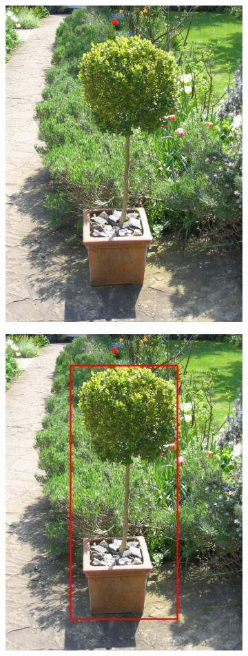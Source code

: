 \documentclass[a4paper,11]{article}
\begin{document}
\begin{center}
\begin{figure}[H]
    \begin{subfigure}{0.33\textwidth}
      \centering
      \includegraphics[width=0.9\linewidth]{images/bush}
    \end{subfigure}
    \begin{subfigure}{.33\textwidth}
      \centering
      \includegraphics[width=0.9\linewidth]{results/input/bush}

\end{subfigure}
\end{figure}
\end{center}
\end{document}
